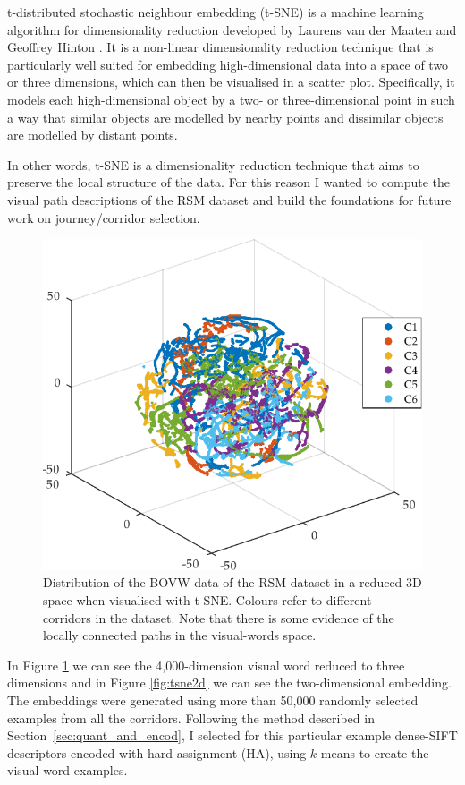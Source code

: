 t-distributed stochastic neighbour embedding (t-SNE) is a machine learning algorithm for dimensionality reduction developed by Laurens van der Maaten and Geoffrey Hinton \cite{maaten2009learning}. It is a non-linear dimensionality reduction technique that is particularly well suited for embedding high-dimensional data into a space of two or three dimensions, which can then be visualised in a scatter plot. Specifically, it models each high-dimensional object by a two- or three-dimensional point in such a way that similar objects are modelled by nearby points and dissimilar objects are modelled by distant points.

In other words, t-SNE is a dimensionality reduction technique that aims to preserve the local structure of the data. For this reason I wanted to compute the visual path descriptions of the RSM dataset and build the foundations for future work on journey/corridor selection.

\begin{figure}
\centering
\includegraphics[width=\textwidth]{gfx/Chapter04/tsne_dsift_3d.pdf}
\caption{Distribution of the BOVW data of the RSM dataset in a reduced 3D space when visualised with t-SNE. Colours refer to different corridors in the dataset. Note that there is some evidence of the locally connected paths in the visual-words space.}
\label{fig:tsne3d}
\end{figure}

In Figure \ref{fig:tsne3d} we can see the 4,000-dimension visual word reduced to three dimensions and in Figure \ref{fig:tsne2d} we can see the two-dimensional embedding. The embeddings were generated using more than 50,000 randomly selected examples from all the corridors. Following the method described in Section~\ref{sec:quant_and_encod}, I selected for this particular example dense-SIFT descriptors encoded with hard assignment (HA), using $k$-means to create the visual word examples.

